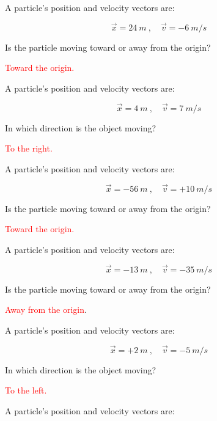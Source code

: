 \documentclass[]{exam}
\begin{document}
\begin{questions}
\question \label{pPNfs}
A particle's position and velocity vectors are:

\begin{equation*}
    \vec{x} = \SI{24}{m}\ , \quad \vec{v} = -\SI{6}{m/s}    
\end{equation*}


Is the particle moving toward or away from the origin?

\ifprintanswers \textcolor{red}{Toward the origin.} \fi

\question %
A particle's position and velocity vectors are:

\begin{equation*}
    \vec{x} = \SI{4}{m}\ , \quad \vec{v} = \SI{7}{m/s}
\end{equation*}


In which direction is the object moving?

\ifprintanswers \textcolor{red}{To the right.} \fi

\question %
A particle's position and velocity vectors are:

\begin{equation*}
    \vec{x} = -\SI{56}{m}\ , \quad \vec{v} = +\SI{10}{m/s}
\end{equation*}


Is the particle moving toward or away from the origin?

\ifprintanswers \textcolor{red}{Toward the origin.} \fi


\question %
A particle's position and velocity vectors are:

\begin{equation*}
    \vec{x} = -\SI{13}{m}\ , \quad \vec{v} = -\SI{35}{m/s}    
\end{equation*}


Is the particle moving toward or away from the origin?

\ifprintanswers \textcolor{red}{Away from the origin}. \fi

\question %
A particle's position and velocity vectors are:

\begin{equation*}
    \vec{x} = +\SI{2}{m}\ , \quad \vec{v} = -\SI{5}{m/s}
\end{equation*}

In which direction is the object moving?

\ifprintanswers \textcolor{red}{To the left.} \fi

\question %
A particle's position and velocity vectors are:


\end{questions}
\end{document}
